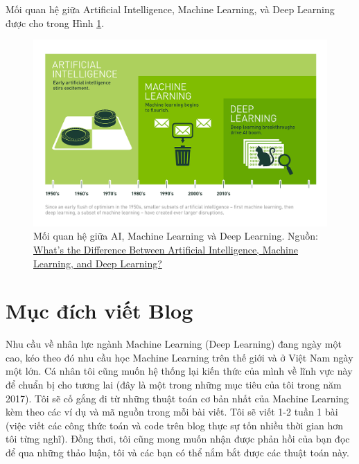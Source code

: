 Mối quan hệ giữa Artificial Intelligence, Machine Learning, và Deep Learning được cho trong Hình \ref{fig:aimldl}.

\begin{figure}
\centering
	\includegraphics[width = \textwidth]{../introduce/aimldl.png}
	\caption[]{Mối quan hệ giữa AI, Machine Learning và Deep Learning. Nguồn: \href{https://blogs.nvidia.com/blog/2016/07/29/whats-difference-artificial-intelligence-machine-learning-deep-learning-ai/}{What’s the Difference Between Artificial Intelligence, Machine Learning, and Deep Learning?}}
	\label{fig:aimldl}
\end{figure}


\section{Mục đích viết Blog}
Nhu cầu về nhân lực ngành Machine Learning (Deep Learning) đang ngày một cao, kéo theo đó nhu cầu học Machine Learning trên thế giới và ở Việt Nam ngày một lớn. Cá nhân tôi cũng muốn hệ thống lại kiến thức của mình về lĩnh vực này để chuẩn bị cho tương lai (đây là một trong những mục tiêu của tôi trong năm 2017). Tôi sẽ cố gắng đi từ những thuật toán cơ bản nhất của Machine Learning kèm theo các ví dụ và mã nguồn trong mỗi bài viết. Tôi sẽ viết 1-2 tuần 1 bài (việc viết các công thức toán và code trên blog thực sự tốn nhiều thời gian hơn tôi từng nghĩ). Đồng thơi, tôi cũng mong muốn nhận được phản hồi của bạn đọc để qua những thảo luận, tôi và các bạn có thể nắm bắt được các thuật toán này. 

